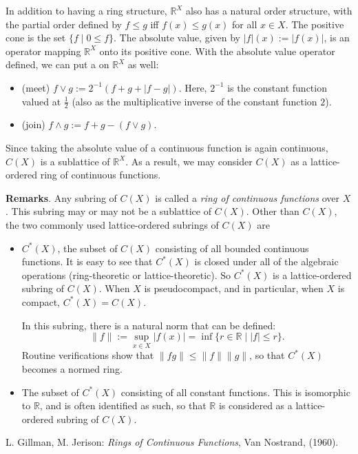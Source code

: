 \documentclass[12pt]{article}
\begin{document}
In addition to having a ring structure, $\mathbb{R}^X$ also has a natural order structure, with the partial order defined by $f\le g$ iff $f(x)\le g(x)$ for all $x\in X$.  The positive cone is the set $\lbrace f\mid 0\le f\rbrace$.  The absolute value, given by $|f|(x):=|f(x)|$, is an operator mapping $\mathbb{R}^X$ onto its positive cone.  With the absolute value operator defined, we can put a  on $\mathbb{R}^X$ as well:
\begin{itemize}
\item (meet) $f\vee g:=2^{-1}(f+g+|f-g|)$.  Here, $2^{-1}$ is the constant function valued at $\frac{1}{2}$ (also as the multiplicative inverse of the constant function $2$).
\item (join) $f\wedge g:=f+g-(f\vee g)$.
\end{itemize}

Since taking the absolute value of a continuous function is again continuous, $C(X)$ is a sublattice of $\mathbb{R}^X$.  As a result, we may consider $C(X)$ as a lattice-ordered ring of continuous functions.

\textbf{Remarks}.  Any subring of $C(X)$ is called a \emph{ring of continuous functions} over $X$.  This subring may or may not be a sublattice of $C(X)$.  Other than $C(X)$, the two commonly used lattice-ordered subrings of $C(X)$ are 
\begin{itemize}
\item 
$C^*(X)$, the subset of $C(X)$ consisting of all bounded continuous functions.  It is easy to see that $C^*(X)$ is closed under all of the algebraic operations (ring-theoretic or lattice-theoretic).  So $C^*(X)$ is a lattice-ordered subring of $C(X)$.  When $X$ is pseudocompact, and in particular, when $X$ is compact, $C^*(X)=C(X)$.  

In this subring, there is a natural norm that can be defined: $$\|f\|:= \sup_{x \in X} |f(x)|=\inf \lbrace r\in\mathbb{R} \mid |f|\le r\rbrace.$$  Routine verifications show that $\|fg\|\le \|f\|\|g\|$, so that $C^*(X)$ becomes a normed ring.
\item
The subset of $C^*(X)$ consisting of all constant functions.  This is isomorphic to $\mathbb{R}$, and is often identified as such, so that $\mathbb{R}$ is considered as a lattice-ordered subring of $C(X)$.
\end{itemize}

\begin{thebibliography}{7}
 L. Gillman, M. Jerison: {\em Rings of Continuous Functions}, Van Nostrand, (1960).
\end{thebibliography}
\end{document}
